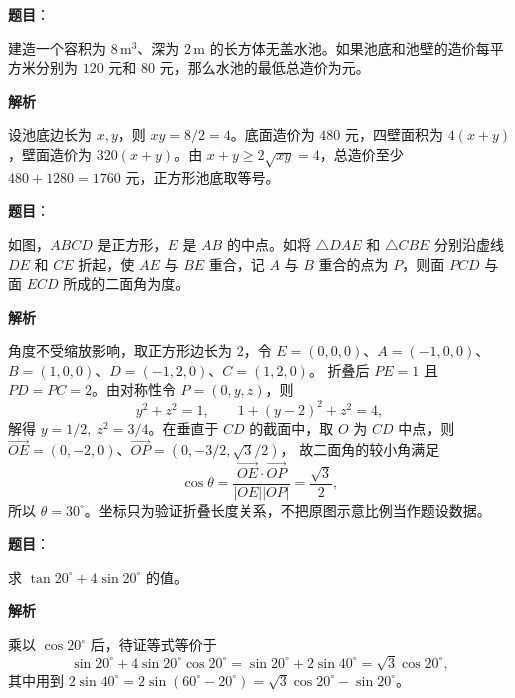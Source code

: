\begin{answer}

\textbf{题目}：

建造一个容积为 $8\,\mathrm{m}^3$、深为 $2\,\mathrm m$ 的长方体无盖水池。如果池底和池壁的造价每平方米分别为 $120$ 元和 $80$ 元，那么水池的最低总造价为\underline{\qquad\qquad}元。

\textbf{解析}

设池底边长为 $x,y$，则 $xy=8/2=4$。底面造价为 $480$ 元，四壁面积为 $4(x+y)$，壁面造价为 $320(x+y)$。由 $x+y\ge2\sqrt{xy}=4$，总造价至少 $480+1280=1760$ 元，正方形池底取等号。


\end{answer}
\begin{answer}

\textbf{题目}：

如图，$ABCD$ 是正方形，$E$ 是 $AB$ 的中点。如将 $\triangle DAE$ 和 $\triangle CBE$ 分别沿虚线 $DE$ 和 $CE$ 折起，使 $AE$ 与 $BE$ 重合，记 $A$ 与 $B$ 重合的点为 $P$，则面 $PCD$ 与面 $ECD$ 所成的二面角为\underline{\qquad\qquad}度。
\nopagebreak[4]
\begin{center}\end{center}
\nopagebreak[4]
\textbf{解析}

角度不受缩放影响，取正方形边长为 $2$，令
$E=(0,0,0)$、$A=(-1,0,0)$、$B=(1,0,0)$、$D=(-1,2,0)$、$C=(1,2,0)$。
折叠后 $PE=1$ 且 $PD=PC=2$。由对称性令 $P=(0,y,z)$，则
\nopagebreak[4]
\[
y^2+z^2=1,\qquad 1+(y-2)^2+z^2=4,
\]
解得 $y=1/2,\ z^2=3/4$。在垂直于 $CD$ 的截面中，取 $O$ 为 $CD$ 中点，则
$\overrightarrow{OE}=(0,-2,0)$、$\overrightarrow{OP}=(0,-3/2,\sqrt3/2)$，
故二面角的较小角满足
\nopagebreak[4]
\[
\cos\theta=\frac{\overrightarrow{OE}\cdot\overrightarrow{OP}}{|OE||OP|}
=\frac{\sqrt3}{2},
\]
所以 $\theta=30^\circ$。坐标只为验证折叠长度关系，不把原图示意比例当作题设数据。


\end{answer}
\begin{answer}

\textbf{题目}：

求 $\tan20^\circ+4\sin20^\circ$ 的值。

\textbf{解析}

乘以 $\cos20^\circ$ 后，待证等式等价于
\nopagebreak[4]
\[
\sin20^\circ+4\sin20^\circ\cos20^\circ
=\sin20^\circ+2\sin40^\circ
=\sqrt3\cos20^\circ,
\]
其中用到 $2\sin40^\circ=2\sin(60^\circ-20^\circ)=\sqrt3\cos20^\circ-\sin20^\circ$。


\end{answer}
